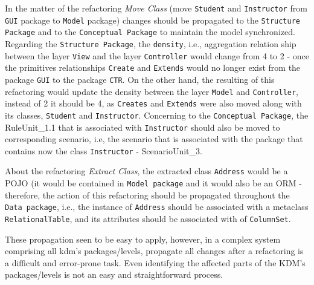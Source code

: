In the matter of the refactoring \textit{Move Class} (move \texttt{Student} and \texttt{Instructor} from \texttt{GUI} package to \texttt{Model} package) changes should be propagated to the \texttt{Structure Package} and to the \texttt{Conceptual Package} to maintain the model synchronized. Regarding the \texttt{Structure Package}, the \texttt{density}, i.e., aggregation relation ship between the layer \texttt{View} and the layer \texttt{Controller} would change from 4 to 2 - once the primitives relationships \texttt{Create} and \texttt{Extends} would no longer exist from the package \texttt{GUI} to the package \texttt{CTR}. On the other hand, the resulting of this refactoring would update the density between the layer \texttt{Model} and \texttt{Controller}, instead of 2 it should be 4, as \texttt{Creates} and \texttt{Extends} were also moved along with its classes, \texttt{Student} and \texttt{Instructor}. Concerning to the \texttt{Conceptual Package}, the  RuleUnit\_1.1 that is associated with \texttt{Instructor} should also be moved to corresponding scenario, i.e, the scenario that is associated with the package that contains now the class \texttt{Instructor} - ScenarioUnit\_3. 

About the refactoring \textit{Extract Class}, the extracted class \texttt{Address} would be a POJO (it would be contained in \texttt{Model package} and it would also be an ORM - therefore, the action of this refactoring should be propagated throughout  the \texttt{Data package}, i.e., the instance of \texttt{Address} should be associated with a metaclass \texttt{RelationalTable}, and its attributes should be associated with  of \texttt{ColumnSet}.


These propagation seen to be easy to apply, however, in a complex system comprising all kdm's packages/levels, propagate all changes after a refactoring is a difficult and error-prone task. Even identifying the affected parts of the KDM's packages/levels is not an easy and straightforward process. 

